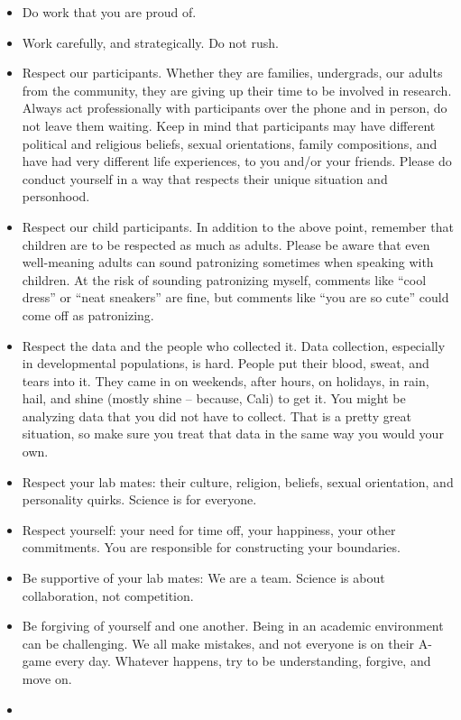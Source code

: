 \documentclass[]{book}
\providecommand{\tightlist}{%
  \setlength{\itemsep}{0pt}\setlength{\parskip}{0pt}}
\begin{document}
\begin{itemize}
\tightlist
\item
  Do work that you are proud of.
\item
  Work carefully, and strategically. Do not rush.
\item
  Respect our participants. Whether they are families, undergrads, our adults from the community, they are giving up their time to be involved in research. Always act professionally with participants over the phone and in person, do not leave them waiting. Keep in mind that participants may have different political and religious beliefs, sexual orientations, family compositions, and have had very different life experiences, to you and/or your friends. Please do conduct yourself in a way that respects their unique situation and personhood.
\item
  Respect our child participants. In addition to the above point, remember that children are to be respected as much as adults. Please be aware that even well-meaning adults can sound patronizing sometimes when speaking with children. At the risk of sounding patronizing myself, comments like ``cool dress'' or ``neat sneakers'' are fine, but comments like ``you are so cute'' could come off as patronizing.
\item
  Respect the data and the people who collected it. Data collection, especially in developmental populations, is hard. People put their blood, sweat, and tears into it. They came in on weekends, after hours, on holidays, in rain, hail, and shine (mostly shine -- because, Cali) to get it. You might be analyzing data that you did not have to collect. That is a pretty great situation, so make sure you treat that data in the same way you would your own.
\item
  Respect your lab mates: their culture, religion, beliefs, sexual orientation, and personality quirks. Science is for everyone.
\item
  Respect yourself: your need for time off, your happiness, your other commitments. You are responsible for constructing your boundaries.
\item
  Be supportive of your lab mates: We are a team. Science is about collaboration, not competition.
\item
  Be forgiving of yourself and one another. Being in an academic environment can be challenging. We all make mistakes, and not everyone is on their A-game every day. Whatever happens, try to be understanding, forgive, and move on.
\item

\end{itemize}
\end{document}
